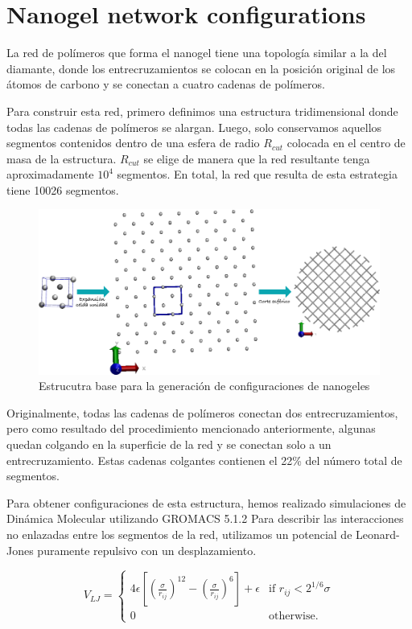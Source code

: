 \appendix
\label{anexo-configuraciones}

\section{Nanogel network configurations}

La red de pol\'imeros que forma el nanogel tiene una topolog\'ia similar a la del diamante, donde los entrecruzamientos se colocan en la posici\'on original de los \'atomos de carbono y se conectan a cuatro cadenas de pol\'imeros.

Para construir esta red, primero definimos una estructura tridimensional donde todas las cadenas de pol\'imeros se alargan. Luego, solo conservamos aquellos segmentos contenidos dentro de una esfera de radio $R_{cut}$ colocada en el centro de masa de la estructura. $R_{cut}$ se elige de manera que la red resultante tenga aproximadamente $10^4$ segmentos. En total, la red que resulta de esta estrategia tiene 10026 segmentos.

\begin{figure}[!ht]
	\centering
	\includegraphics[width=0.5\linewidth]{Figures/graph-anexos/esquema.png}
	\caption{Estrucutra base para la generaci\'on de configuraciones de nanogeles}
	\label{fig:anexo:equema-gel}
\end{figure}




Originalmente, todas las cadenas de pol\'imeros conectan dos entrecruzamientos, pero como resultado del procedimiento mencionado anteriormente, algunas quedan colgando en la superficie de la red y se conectan solo a un entrecruzamiento. Estas cadenas colgantes contienen el 22\% del n\'umero total de segmentos.

Para obtener configuraciones de esta estructura, hemos realizado simulaciones de Din\'amica Molecular utilizando GROMACS 5.1.2 \cite{lindahl2001gromacs}
Para describir las interacciones no enlazadas entre los segmentos de la red, utilizamos un potencial de Leonard-Jones puramente repulsivo con un desplazamiento.

\begin{equation}
	V_{LJ}=\begin{cases}
		4\epsilon \left[\left(\frac{\sigma}{r_{ij}}\right)^{12} - \left(\frac{\sigma}{r_{ij}}\right)^{6}\right] + \epsilon & \text{if $r_{ij} < 2^{1/6}\sigma$}\\
		0 & \text{otherwise}.
	\end{cases}
\end{equation}



